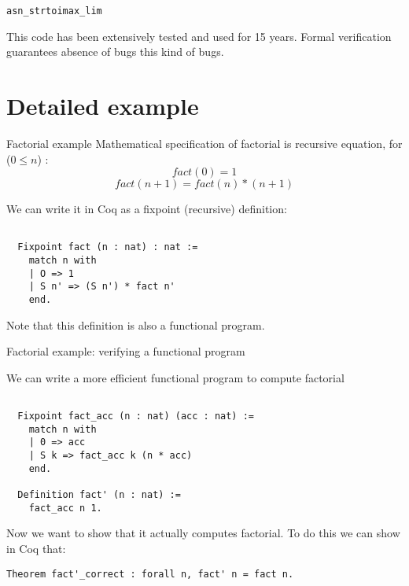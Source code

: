 \documentclass[10pt]{beamer}
\begin{document}
\begin{frame}{\texttt{asn\_strtoimax\_lim}}

This code has been extensively tested and used for 15 years. Formal verification guarantees absence of bugs this kind of bugs. 

\end{frame}

\section{Detailed example}


\begin{frame}[fragile]{Factorial example}
  Mathematical specification of factorial is recursive equation, for ($0 \leq n$) :
  \[ fact(0) = 1 \]
  \[ fact(n + 1) = fact(n)*(n+1) \]
  
  We can write it in Coq as a fixpoint (recursive) definition:
  \begin{lstlisting}[language=Coq]

  Fixpoint fact (n : nat) : nat :=
    match n with
    | O => 1
    | S n' => (S n') * fact n'
    end.

  \end{lstlisting}
  
  Note that this definition is also a functional program.
 
\end{frame}


\begin{frame}[fragile]{Factorial example: verifying a functional program}

  We can write a more efficient functional program to compute factorial

  \begin{lstlisting}[language=Coq]

  Fixpoint fact_acc (n : nat) (acc : nat) :=
    match n with
    | 0 => acc
    | S k => fact_acc k (n * acc)
    end.

  Definition fact' (n : nat) :=
    fact_acc n 1.

  \end{lstlisting}

  Now we want to show that it actually computes factorial. To do this we can show in Coq that:
   \begin{lstlisting}[language=Coq]
  Theorem fact'_correct : forall n, fact' n = fact n.
  \end{lstlisting}
 
\end{frame}
\end{document}
